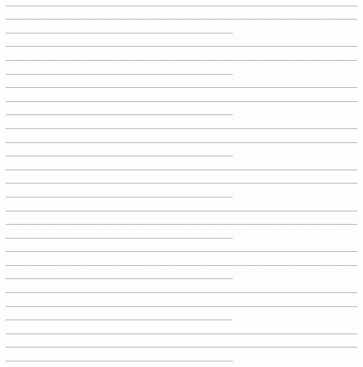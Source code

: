\documentclass[12pt]{article}
\begin{document}
\\\_\_\_\_\_\_\_\_\_\_\_\_\_\_\_\_\_\_\_\_\_\_\_\_\_\_\_\_\_\_\_\_\_\_\_\_\_\_\_\_\_\_\_\_\_\_\_\_\_\_\_\_\_\_\_\_\_\_\_\_\_\_\_\_\_\_\_\_\_\_\_\_\_\_\_\_\_\_\_\_\_\_\_\_\_\_\_\_\_\_\_\_\_\_\_\_\_\_\_\_\_\_\_\_\_\_\_\_\_\_\_\_\_\_\_\_\_\_\_\_\_\_\_\_\_\_\_ \\\_\_\_\_\_\_\_\_\_\_\_\_\_\_\_\_\_\_\_\_\_\_\_\_\_\_\_\_\_\_\_\_\_\_\_\_\_\_\_\_\_\_\_\_\_\_\_\_\_\_\_\_\_\_\_\_\_\_\_\_\_\_\_\_\_\_\_\_\_\_\_\_\_\_\_\_\_\_\_\_\_\_\_\_\_\_\_\_\_\_\_\_\_\_\_\_\_\_\_\_\_\_\_\_\_\_\_\_\_\_\_\_\_\_\_\_\_\_\_\_\_\_\_\_\_\_\_ \\\_\_\_\_\_\_\_\_\_\_\_\_\_\_\_\_\_\_\_\_\_\_\_\_\_\_\_\_\_\_\_\_\_\_\_\_\_\_\_\_\_\_\_\_\_\_\_\_\_\_\_\_\_\_\_\_\_\_\_\_\_\_\_\_\_\_\_\_\_\_\_\_\_\_\_\_\_\_\_\_\_\_\_\_\_\_\_\_\_\_\_\_\_\_\_\_\_\_\_\_\_\_\_\_\_\_\_\_\_\_\_\_\_\_\_\_\_\_\_\_\_\_\_\_\_\_\_ \\\_\_\_\_\_\_\_\_\_\_\_\_\_\_\_\_\_\_\_\_\_\_\_\_\_\_\_\_\_\_\_\_\_\_\_\_\_\_\_\_\_\_\_\_\_\_\_\_\_\_\_\_\_\_\_\_\_\_\_\_\_\_\_\_\_\_\_\_\_\_\_\_\_\_\_\_\_\_\_\_\_\_\_\_\_\_\_\_\_\_\_\_\_\_\_\_\_\_\_\_\_\_\_\_\_\_\_\_\_\_\_\_\_\_\_\_\_\_\_\_\_\_\_\_\_\_\_ \\\_\_\_\_\_\_\_\_\_\_\_\_\_\_\_\_\_\_\_\_\_\_\_\_\_\_\_\_\_\_\_\_\_\_\_\_\_\_\_\_\_\_\_\_\_\_\_\_\_\_\_\_\_\_\_\_\_\_\_\_\_\_\_\_\_\_\_\_\_\_\_\_\_\_\_\_\_\_\_\_\_\_\_\_\_\_\_\_\_\_\_\_\_\_\_\_\_\_\_\_\_\_\_\_\_\_\_\_\_\_\_\_\_\_\_\_\_\_\_\_\_\_\_\_\_\_\_
\\\_\_\_\_\_\_\_\_\_\_\_\_\_\_\_\_\_\_\_\_\_\_\_\_\_\_\_\_\_\_\_\_\_\_\_\_\_\_\_\_\_\_\_\_\_\_\_\_\_\_\_\_\_\_\_\_\_\_\_\_\_\_\_\_\_\_\_\_\_\_\_\_\_\_\_\_\_\_\_\_\_\_\_\_\_\_\_\_\_\_\_\_\_\_\_\_\_\_\_\_\_\_\_\_\_\_\_\_\_\_\_\_\_\_\_\_\_\_\_\_\_\_\_\_\_\_\_
\\\_\_\_\_\_\_\_\_\_\_\_\_\_\_\_\_\_\_\_\_\_\_\_\_\_\_\_\_\_\_\_\_\_\_\_\_\_\_\_\_\_\_\_\_\_\_\_\_\_\_\_\_\_\_\_\_\_\_\_\_\_\_\_\_\_\_\_\_\_\_\_\_\_\_\_\_\_\_\_\_\_\_\_\_\_\_\_\_\_\_\_\_\_\_\_\_\_\_\_\_\_\_\_\_\_\_\_\_\_\_\_\_\_\_\_\_\_\_\_\_\_\_\_\_\_\_\_
\\\_\_\_\_\_\_\_\_\_\_\_\_\_\_\_\_\_\_\_\_\_\_\_\_\_\_\_\_\_\_\_\_\_\_\_\_\_\_\_\_\_\_\_\_\_\_\_\_\_\_\_\_\_\_\_\_\_\_\_\_\_\_\_\_\_\_\_\_\_\_\_\_\_\_\_\_\_\_\_\_\_\_\_\_\_\_\_\_\_\_\_\_\_\_\_\_\_\_\_\_\_\_\_\_\_\_\_\_\_\_\_\_\_\_\_\_\_\_\_\_\_\_\_\_\_\_\_
\\\_\_\_\_\_\_\_\_\_\_\_\_\_\_\_\_\_\_\_\_\_\_\_\_\_\_\_\_\_\_\_\_\_\_\_\_\_\_\_\_\_\_\_\_\_\_\_\_\_\_\_\_\_\_\_\_\_\_\_\_\_\_\_\_\_\_\_\_\_\_\_\_\_\_\_\_\_\_\_\_\_\_\_\_\_\_\_\_\_\_\_\_\_\_\_\_\_\_\_\_\_\_\_\_\_\_\_\_\_\_\_\_\_\_\_\_\_\_\_\_\_\_\_\_\_\_\_
\end{document}
